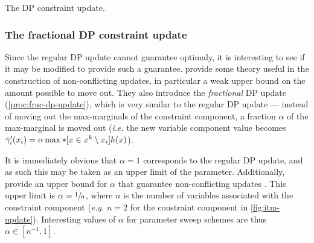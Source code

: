\begin{algorithm}[tbp]
	
	\caption{
		The DP constraint update.
	}
	\label{proc:dp-update}
\end{algorithm}

\subsubsection{The fractional DP constraint update}
Since the regular DP update cannot guarantee optimaly, it is interesting to see if it may be modified to provide such a guarantee.
\Textcite[\pno~105\psqq]{Wedelin08} provide some theory useful in the construction of non-conflicting updates, in particular a weak upper bound on the amount possible to move out.
They also introduce the \emph{fractional} DP update (\cref{proc:frac-dp-update}), which is very similar to the regular DP update --- instead of moving out the max-marginals of the constraint component, a fraction \(\alpha\) of the max-marginal is moved out (\emph{i.e.} the new variable component value becomes \(\bar{\gamma}'_i(x_i) = \alpha\max*[x\in x^k\setminus x_i]{h(x)}\)).

It is immediately obvious that \(\alpha=1\) corresponds to the regular DP update, and as such this may be taken as an upper limit of the parameter.
Additionally, \textcite{Wedelin08} provide an upper bound for \(\alpha\) that guarantee non-conflicting updates \parencite[\pno~107]{Wedelin08}.
This upper limit is \(\alpha=\sfrac{1}{n}\), where \(n\) is the number of variables associated with the constraint component (\emph{e.g.} \(n=2\) for the constraint component in \cref{fig:itm-update}).
Interesting values of \(\alpha\) for parameter sweep schemes are thus \(\alpha\in[n^{-1},1]\).

